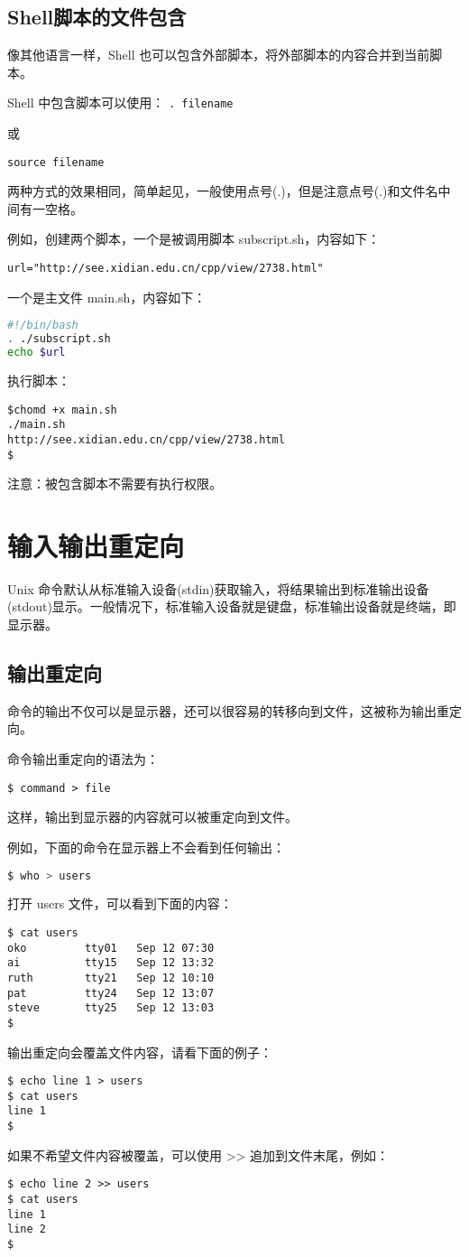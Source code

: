 \subsection{Shell脚本的文件包含}
像其他语言一样，Shell 也可以包含外部脚本，将外部脚本的内容合并到当前脚本。

Shell 中包含脚本可以使用：
\verb|. filename|

或

\verb|source filename|

两种方式的效果相同，简单起见，一般使用点号(.)，但是注意点号(.)和文件名中间有一空格。

例如，创建两个脚本，一个是被调用脚本 subscript.sh，内容如下：

\verb|url="http://see.xidian.edu.cn/cpp/view/2738.html"|

一个是主文件 main.sh，内容如下：
\begin{lstlisting}[language=sh]
#!/bin/bash
. ./subscript.sh
echo $url
\end{lstlisting}
执行脚本：
\begin{verbatim}
$chomd +x main.sh
./main.sh
http://see.xidian.edu.cn/cpp/view/2738.html
$
\end{verbatim}
注意：被包含脚本不需要有执行权限。








\section{输入输出重定向}
Unix 命令默认从标准输入设备(stdin)获取输入，将结果输出到标准输出设备(stdout)显示。一般情况下，标准输入设备就是键盘，标准输出设备就是终端，即显示器。


\subsection{输出重定向}
命令的输出不仅可以是显示器，还可以很容易的转移向到文件，这被称为输出重定向。

命令输出重定向的语法为：

\verb|$ command > file|

这样，输出到显示器的内容就可以被重定向到文件。

例如，下面的命令在显示器上不会看到任何输出：
\begin{lstlisting}[language=sh]
$ who > users
\end{lstlisting}
打开 users 文件，可以看到下面的内容：
\begin{verbatim}
$ cat users
oko         tty01   Sep 12 07:30
ai          tty15   Sep 12 13:32
ruth        tty21   Sep 12 10:10
pat         tty24   Sep 12 13:07
steve       tty25   Sep 12 13:03
$
\end{verbatim}
输出重定向会覆盖文件内容，请看下面的例子：
\begin{verbatim}
$ echo line 1 > users
$ cat users
line 1
$
\end{verbatim}
如果不希望文件内容被覆盖，可以使用 >> 追加到文件末尾，例如：
\begin{verbatim}
$ echo line 2 >> users
$ cat users
line 1
line 2
$
\end{verbatim}


